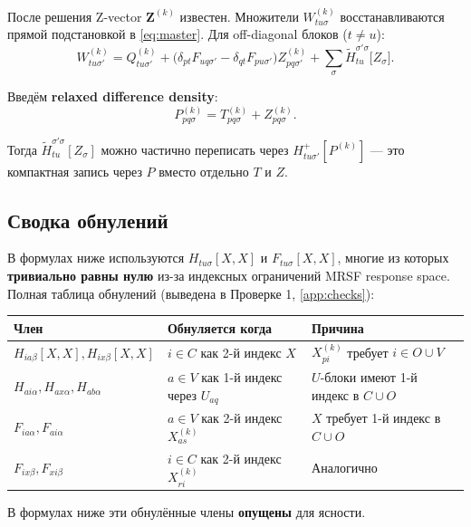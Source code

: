 \documentclass[11pt, a4paper]{article}
\theoremstyle{definition}
\newcommand{\Hp}{H^{+}}
\begin{document}
После решения Z-vector $\mathbf Z^{(k)}$ известен. Множители $W^{(k)}_{tu\sigma}$ восстанавливаются прямой подстановкой в \eqref{eq:master}. Для off-diagonal блоков ($t \ne u$):
\begin{equation}
    W^{(k)}_{tu\sigma'} = Q^{(k)}_{tu\sigma'} + \bigl( \delta_{pt} F_{uq\sigma'} - \delta_{qt} F_{pu\sigma'} \bigr) Z^{(k)}_{pq\sigma'} + \sum_\sigma \tilde H^{\sigma'\sigma}_{tu}\bigl[ Z_\sigma \bigr].
\end{equation}

Введём \textbf{relaxed difference density}:
\begin{equation}
    P^{(k)}_{pq\sigma} = T^{(k)}_{pq\sigma} + Z^{(k)}_{pq\sigma}.
    \label{eq:Pdef}
\end{equation}

Тогда $\tilde H^{\sigma'\sigma}_{tu}[Z_\sigma]$ можно частично переписать через $\Hp_{tu\sigma'}[P^{(k)}]$ --- это компактная запись через $P$ вместо отдельно $T$ и $Z$.

\subsection{Сводка обнулений}

В формулах ниже используются $H_{tu\sigma}[X, X]$ и $F_{tu\sigma}[X, X]$, многие из которых \textbf{тривиально равны нулю} из-за индексных ограничений MRSF response space. Полная таблица обнулений (выведена в Проверке 1, \cref{app:checks}):

\begin{center}
\begin{tabularx}{0.95\textwidth}{lll}
\toprule
Член & Обнуляется когда & Причина \\
\midrule
$H_{ia\beta}[X, X], H_{ix\beta}[X, X]$ & $i \in C$ как 2-й индекс $X$ & $X^{(k)}_{pi}$ требует $i \in O \cup V$ \\
$H_{ai\alpha}, H_{ax\alpha}, H_{ab\alpha}$ & $a \in V$ как 1-й индекс через $U_{aq}$ & $U$-блоки имеют 1-й индекс в $C \cup O$ \\
$F_{ia\alpha}, F_{ai\alpha}$ & $a \in V$ как 2-й индекс $X^{(k)}_{as}$ & $X$ требует 1-й индекс в $C \cup O$ \\
$F_{ix\beta}, F_{xi\beta}$ & $i \in C$ как 2-й индекс $X^{(k)}_{ri}$ & Аналогично \\
\bottomrule
\end{tabularx}
\end{center}

В формулах ниже эти обнулённые члены \textbf{опущены} для ясности.
\end{document}
